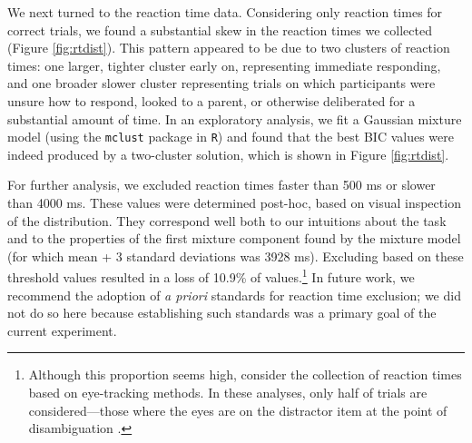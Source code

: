 \documentclass[man,noapacite]{apa2}
\begin{document}

We next turned to the reaction time data. Considering only reaction times for correct trials, we found a substantial skew in the reaction times we collected (Figure \ref{fig:rtdist}). This pattern appeared to be due to two clusters of reaction times: one larger, tighter cluster early on, representing immediate responding, and one broader slower cluster representing trials on which participants were unsure how to respond, looked to a parent, or otherwise deliberated for a substantial amount of time. In an exploratory analysis, we fit a Gaussian mixture model (using the \texttt{mclust} package in \texttt{R}) and found that the best BIC values were indeed produced by a two-cluster solution, which is shown in Figure \ref{fig:rtdist}. 

For further analysis, we excluded reaction times faster than 500 ms or slower than 4000 ms. These values were determined post-hoc, based on visual inspection of the distribution. They correspond well both to our intuitions about the task and to the properties of the first mixture component found by the mixture model (for which mean + 3 standard deviations was 3928 ms). Excluding based on these threshold values resulted in a loss of 10.9\% of values.\footnote{Although this proportion seems high, consider the collection of reaction times based on eye-tracking methods. In these analyses, only half of trials are considered---those where the eyes are on the distractor item at the point of disambiguation \cite{fernald2008}.} In future work, we recommend the adoption of {\it a priori} standards for reaction time exclusion; we did not do so here because establishing such standards was a primary goal of the current experiment. 
\end{document}

